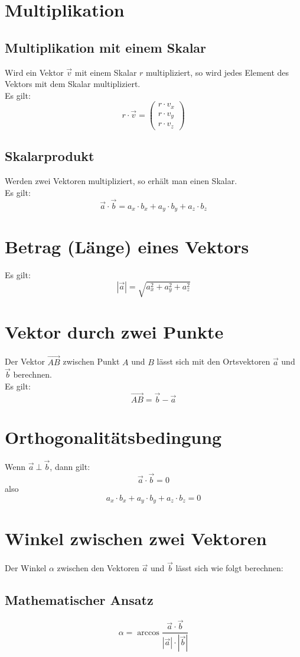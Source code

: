 \documentclass[a4paper,12pt]{article}
\begin{document}
\section{Multiplikation}
\subsection{Multiplikation mit einem Skalar}
Wird ein Vektor $\vec{v}$ mit einem Skalar $r$ multipliziert, so wird jedes Element des Vektors mit dem Skalar multipliziert.\\
Es gilt:
$$r \cdot \vec{v} = \begin{pmatrix}r \cdot v_x\\r \cdot v_y\\r \cdot v_z\end{pmatrix}$$
\subsection{Skalarprodukt}
Werden zwei Vektoren multipliziert, so erhält man einen Skalar.\\
Es gilt:
$$\vec{a} \cdot \vec{b} = a_x \cdot b_x + a_y \cdot b_y + a_z \cdot b_z$$
\section{Betrag (Länge) eines Vektors}
Es gilt:
$$|\vec{a}| = \sqrt{a_{x}^{2} + a_{y}^{2} + a_{z}^{2}}$$
\section{Vektor durch zwei Punkte}
Der Vektor $\vec{AB}$ zwischen Punkt $A$ und $B$ lässt sich mit den Ortsvektoren $\vec{a}$ und $\vec{b}$ berechnen.\\
Es gilt:
$$\vec{AB} = \vec{b} - \vec{a}$$
\section{Orthogonalitätsbedingung}
Wenn $\vec{a}\ \bot\ \vec{b}$, dann gilt:
$$\vec{a} \cdot \vec{b} = 0$$
also
$$a_x \cdot b_x + a_y \cdot b_y + a_z \cdot b_z = 0$$
\section{Winkel zwischen zwei Vektoren}
Der Winkel $\alpha$ zwischen den Vektoren $\vec{a}$ und $\vec{b}$ lässt sich wie folgt berechnen:
\subsection{Mathematischer Ansatz}
$$\alpha = \arccos{\frac{\vec{a} \cdot \vec{b}}{|\vec{a}| \cdot |\vec{b}|}}$$
\end{document}
